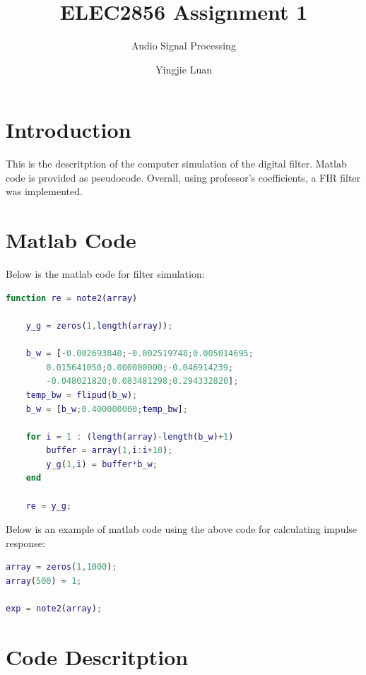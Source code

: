 \documentclass[11pt]{scrartcl}
\begin{document}
\title{ELEC2856 Assignment 1}
\subtitle{ Audio Signal Processing}
\author{Yingjie Luan}
\maketitle

\tableofcontents

\section{Introduction} %

This is the descritption of the computer simulation of the digital filter. Matlab code is provided as pseudocode. Overall, using professor's coefficients, a FIR filter was implemented.  



\section{Matlab Code} %

Below is the matlab code for filter simulation:
\begin{lstlisting}[language=Matlab]
function re = note2(array)
    
    y_g = zeros(1,length(array));
    
    b_w = [-0.002693840;-0.002519748;0.005014695;
        0.015641050;0.000000000;-0.046914239;
        -0.048021820;0.083481298;0.294332820];
    temp_bw = flipud(b_w);
    b_w = [b_w;0.400000000;temp_bw];
    
    for i = 1 : (length(array)-length(b_w)+1)
        buffer = array(1,i:i+18);
        y_g(1,i) = buffer*b_w;      
    end
    
    re = y_g;
\end{lstlisting}

Below is an example of matlab code using the above code for calculating impulse response:
\begin{lstlisting}[language=Matlab]
array = zeros(1,1000);
array(500) = 1;

exp = note2(array);
\end{lstlisting}


\section{Code Descritption} %
\end{document}
